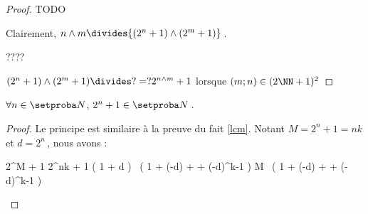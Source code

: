 \begin{proof}
	TODO
	
	Clairement, $n \wedge m \divides {(2^n + 1) \wedge (2^m + 1)}$\,.
	
	????
	
	$(2^n + 1) \wedge (2^m + 1) \divides ? = ? 2^{n \wedge m} + 1$ lorsque $(m ; n) \in (2 \NN + 1)^2$
\end{proof}




\begin{fact}
	$\forall n \in \ourset$, $2^n + 1 \in \ourset$\,.
\end{fact}

\begin{proof}
	Le principe est similaire à la preuve du fait \ref{lcm}.
	Notant $M = 2^n + 1 = n k$ et $d = 2^n$\,, nous avons :

	\medskip
	
	\begin{stepcalc}[style = sar]
		2^M + 1
	\explnext{}
		2^{nk} + 1
	\explnext{}
		\big( 1 + d \big) \, \big( 1 + (-d) + \cdots + (-d)^{k-1} \big)
	\explnext{}
		M \, \big( 1 + (-d) + \cdots + (-d)^{k-1} \big)
	\end{stepcalc}
	
	\leavevmode
\end{proof}

